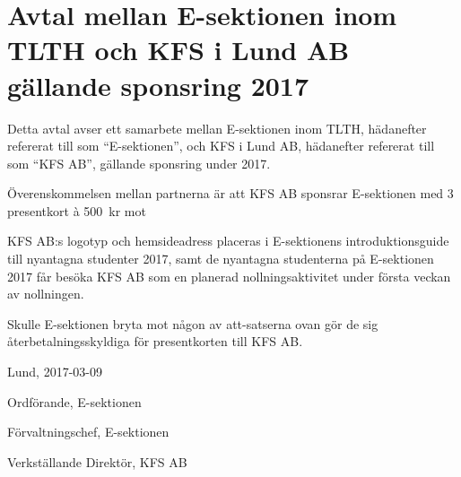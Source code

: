 \documentclass[10pt]{article}
\def\year{2017}
\def\doctitle{Avtal mellan E-sektionen inom TLTH och KFS i Lund AB gällande sponsring {\year}}
\def\date{2017-03-09} %
\begin{document}
    \section*{\doctitle}
    Detta avtal avser ett samarbete mellan E-sektionen inom TLTH, hädanefter refererat till som ``E-sektionen'', och KFS i Lund AB, hädanefter refererat till som ``KFS AB'', gällande sponsring under 2017.

    Överenskommelsen mellan partnerna är att KFS AB sponsrar E-sektionen med 3 presentkort \`{a} \SI{500}{kr} mot
    \begin{attsatser}
        \att KFS AB:s logotyp och hemsideadress placeras i E-sektionens introduktionsguide till nyantagna studenter 2017, samt
        \att de nyantagna studenterna på E-sektionen 2017 får besöka KFS AB som en planerad nollningsaktivitet under första veckan av nollningen.
    \end{attsatser}
    Skulle E-sektionen bryta mot någon av att-satserna ovan gör de sig återbetalningsskyldiga för presentkorten till KFS AB.

    \begin{signatures}{3}
        Lund, \date
        \signature{Erik Månsson}{Ordförande, E-sektionen}
        \signature{Sophia Grimmeiss Grahm}{Förvaltningschef, E-sektionen}
        \signature{Ingrid Lamberg}{Verkställande Direktör, KFS AB}
    \end{signatures}
\end{document}
